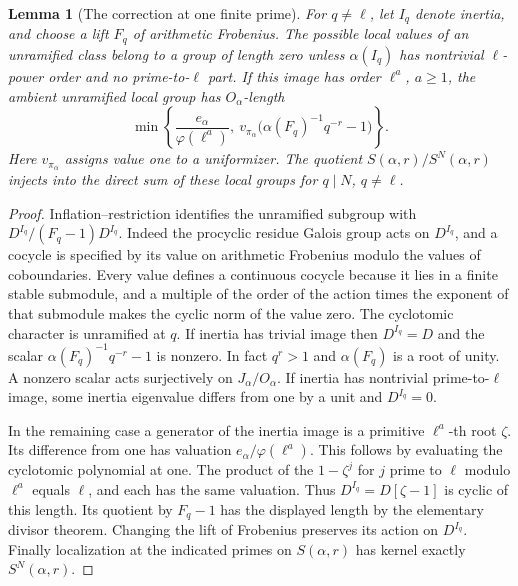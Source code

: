 \documentclass[a4paper,11pt]{article}
\newtheorem{lemma}[proposition]{Lemma}
\theoremstyle{definition}
\theoremstyle{remark}
\numberwithin{equation}{section}
\begin{document}
\begin{lemma}[The correction at one finite prime]\leavevmode\label{lem:locallevel345}
For $q\ne\ell$, let $I_q$ denote inertia, and choose a lift $F_q$ of
arithmetic Frobenius. The possible local values of an unramified
class belong to a group of length zero unless $\alpha(I_q)$ has
nontrivial $\ell$-power order and no prime-to-$\ell$ part. If this
image has order $\ell^a$, $a\ge1$, the ambient unramified local
group has $O_\alpha$-length
\[
 \min\!\left\{\frac{e_\alpha}{\varphi(\ell^a)},\
     v_{\pi_\alpha}\big(\alpha(F_q)^{-1}q^{-r}-1\big)\right\}.
\]
Here $v_{\pi_\alpha}$ assigns value one to a uniformizer.
The quotient $S(\alpha,r)/S^N(\alpha,r)$ injects into the direct
sum of these local groups for $q\mid N$, $q\ne\ell$.
\end{lemma}
\begin{proof}
Inflation--restriction identifies the unramified subgroup with
$D^{I_q}/(F_q-1)D^{I_q}$. Indeed the procyclic residue Galois
group acts on $D^{I_q}$, and a cocycle is specified by its value
on arithmetic Frobenius modulo the values of coboundaries. Every
value defines a continuous cocycle because it lies in a finite stable
submodule, and a multiple of the order of the action times the
exponent of that submodule makes the cyclic norm of the value zero.
The cyclotomic character is unramified at $q$.
If inertia has trivial image then $D^{I_q}=D$ and
the scalar $\alpha(F_q)^{-1}q^{-r}-1$ is nonzero. In fact
$q^r>1$ and $\alpha(F_q)$ is a root of unity. A nonzero scalar
acts surjectively on $J_\alpha/O_\alpha$. If inertia has
nontrivial prime-to-$\ell$ image, some inertia eigenvalue differs
from one by a unit and $D^{I_q}=0$.

In the remaining case a generator of the inertia image is a
primitive $\ell^a$-th root $\zeta$. Its difference from one has
valuation $e_\alpha/\varphi(\ell^a)$. This follows by evaluating
the cyclotomic polynomial at one. The product of the
$1-\zeta^j$ for $j$ prime to $\ell$ modulo $\ell^a$ equals $\ell$,
and each has the same valuation. Thus $D^{I_q}=D[\zeta-1]$ is
cyclic of this length. Its quotient by $F_q-1$ has the displayed
length by the elementary divisor theorem. Changing the lift of
Frobenius preserves its action on $D^{I_q}$. Finally localization
at the indicated primes on $S(\alpha,r)$ has kernel exactly
$S^N(\alpha,r)$.
\end{proof}
\end{document}
